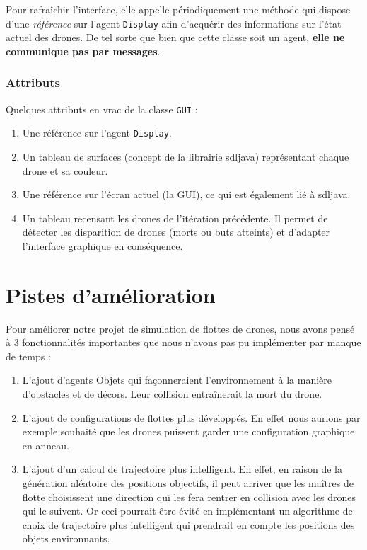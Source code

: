 \documentclass[11pt]{report}
\begin{document}
Pour rafraîchir l'interface, elle appelle périodiquement une méthode qui dispose d'une \textit{référence} sur l'agent \verb|Display| afin d'acquérir des informations sur l'état actuel des drones. De tel sorte que bien que cette classe soit un agent, \textbf{elle ne communique pas par messages}.

\subsubsection{Attributs}

Quelques attributs en vrac de la classe \verb|GUI| :

\begin{enumerate}
\item Une référence sur l'agent \verb|Display|.

\item Un tableau de surfaces (concept de la librairie sdljava) représentant chaque drone et sa couleur.

\item Une référence sur l'écran actuel (la GUI), ce qui est également lié à sdljava.

\item Un tableau recensant les drones de l'itération précédente. Il permet de détecter les disparition de drones (morts ou buts atteints) et d'adapter l'interface graphique en conséquence.
\end{enumerate}

\section{Pistes d'amélioration}

Pour améliorer notre projet de simulation de flottes de drones, nous avons pensé à 3 fonctionnalités importantes que nous n'avons pas pu implémenter par manque de temps :

\begin{enumerate}
\item L'ajout d'agents Objets qui façonneraient l'environnement à la manière d'obstacles et de décors. Leur collision entraînerait la mort du drone.
\item L'ajout de configurations de flottes plus développés. En effet nous aurions par exemple souhaité que les drones puissent garder une configuration graphique en anneau.
\item L'ajout d'un calcul de trajectoire plus intelligent. En effet, en raison de la génération aléatoire des positions objectifs, il peut arriver que les maîtres de flotte choisissent une direction qui les fera rentrer en collision avec les drones qui le suivent. Or ceci pourrait être évité en implémentant un algorithme de choix de trajectoire plus intelligent qui prendrait en compte les positions des objets environnants.
\end{enumerate}
\end{document}
